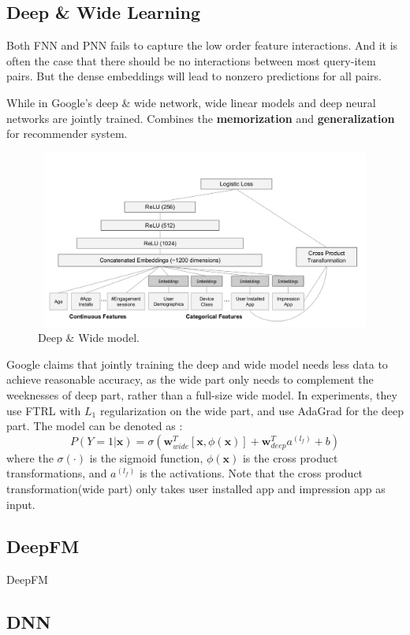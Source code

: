 \documentclass{article}
\begin{document}
\subsection{Deep \& Wide Learning}
Both FNN and PNN fails to capture the low order feature interactions. And it is often the case that there should be no interactions between most query-item pairs. But the dense embeddings will lead to nonzero predictions for all pairs.

While in Google's deep \& wide network\cite{DBLP:conf/recsys/Cheng0HSCAACCIA16}, wide linear models and deep neural networks are jointly trained. Combines the \textbf{memorization} and \textbf{generalization} for recommender system.

\begin{figure}[H]
\centering
\includegraphics[width=4.5in,height=2.3in]{deepandwide}
\caption{Deep \& Wide model.}
\end{figure}
Google claims that jointly training the deep and wide model needs less data to achieve reasonable accuracy, as the wide part only needs to complement the weeknesses of deep part, rather than a full-size wide model.
In experiments, they use FTRL with $L_{1}$ regularization on the wide part, and use AdaGrad for the deep part. The model can be denoted as :
$$P(Y=1|\textbf{x})=\sigma(\textbf{w}_{wide}^{T}[\textbf{x},\phi(\textbf{x})]
+ \textbf{w}_{deep}^{T}a^{(l_{f})} +b
)$$
where the $\sigma(\cdot)$ is the sigmoid function, $\phi(\textbf{x})$ is the cross product transformations, and $a^{(l_{f})}$ is the activations. Note that the cross product transformation(wide part) only takes user installed app and impression app as input.
\subsection{DeepFM}
DeepFM\cite{DBLP:journals/corr/GuoTYLH17}
\subsection{DNN}



\end{document}
